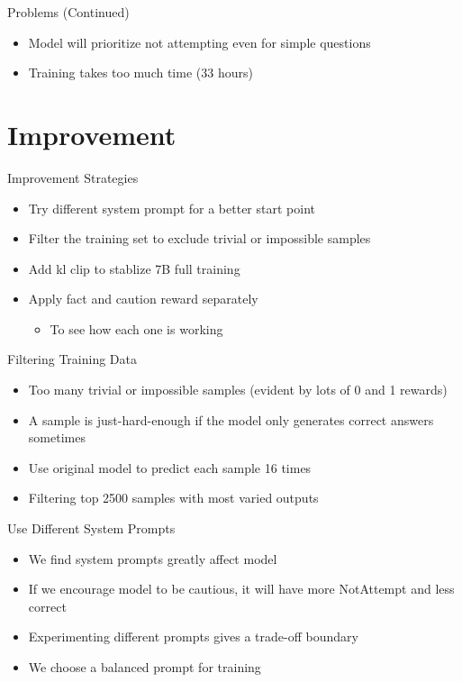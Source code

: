 \documentclass[aspectratio=169]{beamer}
\begin{document}
\begin{frame}{Problems (Continued)}
    \begin{itemize}
        \item Model will prioritize not attempting even for simple questions
        \item Training takes too much time (33 hours)
    \end{itemize}
\end{frame}

\section{Improvement}
\begin{frame}{Improvement Strategies}
    \begin{itemize}
        \item Try different system prompt for a better start point
        \item Filter the training set to exclude trivial or impossible samples
        \item Add kl clip to stablize 7B full training
        \item Apply fact and caution reward separately
        \begin{itemize}
            \item To see how each one is working
        \end{itemize}
    \end{itemize}
\end{frame}

\begin{frame}{Filtering Training Data}
    \begin{itemize}
        \item Too many trivial or impossible samples (evident by lots of 0 and 1 rewards)
        \item A sample is just-hard-enough if the model only generates correct answers sometimes
        \item Use original model to predict each sample 16 times
        \item Filtering top 2500 samples with most varied outputs
    \end{itemize}
\end{frame}

\begin{frame}{Use Different System Prompts}
    \begin{itemize}
        \item We find system prompts greatly affect model
        \item If we encourage model to be cautious, it will have more NotAttempt and less correct
        \item Experimenting different prompts gives a trade-off boundary
        \item We choose a balanced prompt for training
    \end{itemize}
\end{frame}
\end{document}
